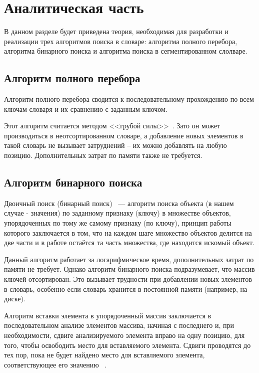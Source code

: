 \chapter{Аналитическая часть}

В данном разделе будет приведена теория, необходимая для разработки и реализации трех алгоритмов поиска в словаре: алгоритма полного перебора, алгоритма бинарного поиска и алгоритма поиска в сегментированном слолваре. 

\section{Алгоритм полного перебора}

Алгоритм полного перебора сводится к последовательному прохождению по всем ключам словаря и их сравнению с заданным ключом. 


Этот алгоритм считается методом <<грубой силы>>~\cite{kekw}. Зато он может производиться в неотсортированном словаре, а добавление новых элементов в такой словарь не вызывает затруднений -- их можно добавлять на любую позицию. Дополнительных затрат по памяти также не требуется.

\section{Алгоритм бинарного поиска}

Двоичный поиск (бинарный поиск)~\cite{second_article} — алгоритм поиска объекта (в нашем случае - значения) по заданному признаку (ключу) в множестве объектов, упорядоченных по тому же самому признаку (по ключу), принцип работы которого заключается в том, что на каждом шаге множество объектов делится на две части и в работе остаётся та часть множества, где находится искомый объект. 

Данный алгоритм работает за логарифмическое время, дополнительных затрат по памяти не требует. Однако алгоритм бинарного поиска подразумевает, что массив ключей отсортирован. Это вызывает трудности при добавлении новых элементов в словарь, особенно если словарь хранится в постоянной памяти (например, на диске).

Алгоритм вставки элемента в упорядоченный массив заключается в последовательном анализе элементов массива, начиная с последнего и, при необходимости, сдвиге анализируемого элемента вправо на одну позицию, для того, чтобы освободить место для вставляемого элемента. Сдвиги проводятся до тех пор, пока не будет найдено место для вставляемого элемента, соответствующее его значению ~\cite{third_article}.

